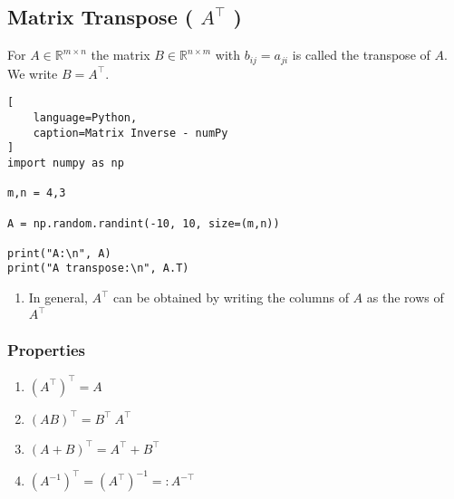 \subsection{Matrix Transpose ( $A^{\top}$ ) \cite{mfml/book/mml/Deisenroth-Faisal-Ong}}

For $A \in \mathbb{R}^{m\times n}$ the matrix $B \in \mathbb{R}^{n\times m}$ with $b_{ij} = a_{ji}$ is called the transpose of $A$. We write $B = A^\top$.
\hfill \cite{mfml/book/mml/Deisenroth-Faisal-Ong}






\begin{lstlisting}[
    language=Python,
    caption=Matrix Inverse - numPy
]
import numpy as np

m,n = 4,3

A = np.random.randint(-10, 10, size=(m,n))

print("A:\n", A)
print("A transpose:\n", A.T)
\end{lstlisting}







\begin{enumerate}
    \item In general, $A^\top$ can be obtained by writing the columns of $A$ as the rows of $A^\top$
    \hfill \cite{mfml/book/mml/Deisenroth-Faisal-Ong}

\end{enumerate}



\subsubsection{Properties}

\begin{multicols}{2}
\begin{enumerate}[itemsep=0.2cm]
    \item $(A^\top)^\top = A$
    \hfill \cite{mfml/book/mml/Deisenroth-Faisal-Ong}

    \item $(AB)^\top = B^\top\ A^\top$
    \hfill \cite{mfml/book/mml/Deisenroth-Faisal-Ong}

    \item $(A+B)^\top = A^\top + B^\top$
    \hfill \cite{mfml/book/mml/Deisenroth-Faisal-Ong}

    \item $(A^{-1})^\top = (A^\top)^{-1} =: A^{-\top}$
    \hfill \cite{mfml/book/mml/Deisenroth-Faisal-Ong}

\end{enumerate}
\end{multicols}







